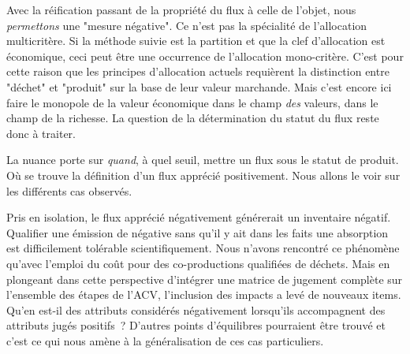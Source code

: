 Avec la réification passant de la propriété du flux à celle de l'objet, nous \textit{permettons} une "mesure négative".
Ce n'est pas la spécialité de l'allocation multicritère.
Si la méthode suivie est la partition et que la clef d'allocation est économique, ceci peut être une occurrence de l'allocation mono-critère.
C'est pour cette raison que les principes d'allocation actuels requièrent la distinction entre "déchet" et "produit" sur la base de leur valeur marchande.
Mais c'est encore ici faire le monopole de la valeur économique dans le champ \emph{des} valeurs, dans le champ de la richesse.
La question de la détermination du statut du flux reste donc à traiter.

La nuance porte sur \emph{quand}, à quel seuil, mettre un flux sous le statut de produit.
Où se trouve la définition d'un flux apprécié positivement.
Nous allons le voir sur les différents cas observés.

Pris en isolation, le flux apprécié négativement générerait un inventaire négatif.
Qualifier une émission de négative sans qu'il y ait dans les faits une absorption est difficilement tolérable scientifiquement.
Nous n'avons rencontré ce phénomène qu'avec l'emploi du coût pour des co-productions qualifiées de déchets.
Mais en plongeant dans cette perspective d'intégrer une matrice de jugement complète sur l'ensemble des étapes de l'ACV, l'inclusion des impacts a levé de nouveaux items.
Qu'en est-il des attributs considérés négativement lorsqu'ils accompagnent des attributs jugés positifs~?
D'autres points d'équilibres pourraient être trouvé et c'est ce qui nous amène à la généralisation de ces cas particuliers.
